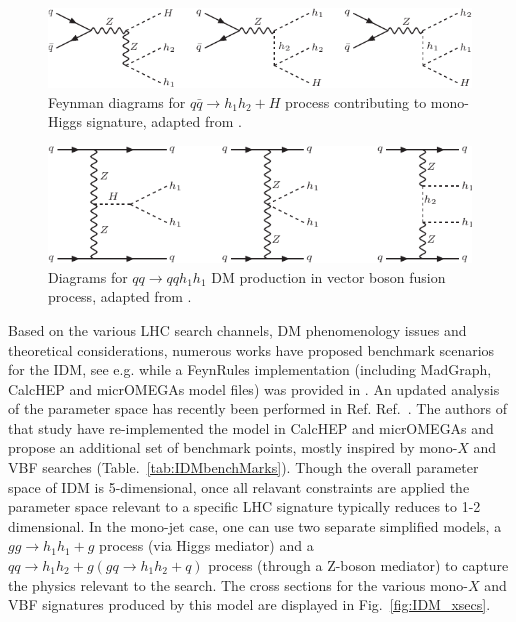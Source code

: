 \begin{figure}[htb]
\includegraphics[width=\textwidth]{figures/EW/i2HDM/fd-mono-h2.pdf} 
\caption{Feynman diagrams for $q\bar{q}\to h_1 h_2+H$  process 
contributing to mono-Higgs signature, adapted from \cite{Belyaev:2015tap}.}
\label{fig:fdmonoH2}
\end{figure}
\begin{figure}[htb]
\includegraphics[width=\textwidth]{figures/EW/i2HDM/fd-vbf.pdf} 
\caption{Diagrams for $qq\to qq h_1 h_1$ DM production in vector boson
fusion process, adapted from \cite{Belyaev:2015tap}.}
\label{fig:fdvbf}
\end{figure}

Based on the various LHC search channels, DM phenomenology issues and theoretical considerations, numerous works have proposed benchmark scenarios for the IDM, see e.g. \cite{IDMmultileptons,Goudelis:2013uca} while a FeynRules implementation (including MadGraph, CalcHEP and micrOMEGAs model files) was provided in \cite{IDMmultileptons}. An updated analysis of the parameter space has recently been performed in Ref. Ref.~\cite{Belyaev:2015tap}. The authors of that study have re-implemented the model in CalcHEP and micrOMEGAs and propose an additional set of benchmark points, mostly inspired by mono-$X$ and VBF searches (Table.~\ref{tab:IDMbenchMarks}). Though the overall parameter space of IDM is 5-dimensional, once all relavant constraints are applied the parameter space relevant to a specific LHC signature typically reduces to 1-2 dimensional. In the mono-jet case, one can use two separate simplified models, a $gg \rightarrow h_1 h_1 + g$ process (via Higgs mediator) and a $qq \rightarrow h_1 h_2 + g (gq \rightarrow h_1 h_2 + q)$ process (through a Z-boson mediator) to capture the physics relevant to the search.
The cross sections for the various mono-$X$ and VBF signatures produced by this model are displayed in Fig.~\ref{fig:IDM_xsecs}.

